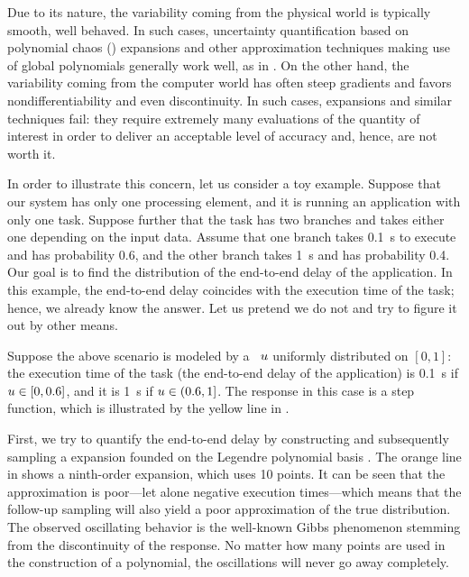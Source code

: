 
Due to its nature, the variability coming from the physical world is typically
smooth, well behaved. In such cases, uncertainty quantification based on
polynomial chaos () expansions \cite{xiu2010} and other approximation
techniques making use of global polynomials generally work well, as in
\cite{bhardwaj2008, lee2013, ukhov2014, ukhov2015}. On the other hand, the
variability coming from the computer world has often steep gradients and favors
nondifferentiability and even discontinuity. In such cases,  expansions
and similar techniques fail: they require extremely many evaluations of the
quantity of interest in order to deliver an acceptable level of accuracy and,
hence, are not worth it.

In order to illustrate this concern, let us consider a toy example. Suppose that
our system has only one processing element, and it is running an application
with only one task. Suppose further that the task has two branches and takes
either one depending on the input data. Assume that one branch takes 0.1~s to
execute and has probability 0.6, and the other branch takes 1~s and has
probability 0.4. Our goal is to find the distribution of the end-to-end delay of
the application. In this example, the end-to-end delay coincides with the
execution time of the task; hence, we already know the answer. Let us pretend we
do not and try to figure it out by other means.

Suppose the above scenario is modeled by a \rv\ $u$ uniformly distributed on
$[0, 1]$: the execution time of the task (the end-to-end delay of the
application) is 0.1~s if $u \in [0, 0.6]$, and it is 1~s if $u \in (0.6, 1]$.
The response in this case is a step function, which is illustrated by the yellow
line in .

First, we try to quantify the end-to-end delay by constructing and subsequently
sampling a  expansion founded on the Legendre polynomial basis
\cite{xiu2010}. The orange line in  shows a ninth-order 
expansion, which uses 10 points. It can be seen that the approximation is
poor---let alone negative execution times---which means that the follow-up
sampling will also yield a poor approximation of the true distribution. The
observed oscillating behavior is the well-known Gibbs phenomenon stemming from
the discontinuity of the response. No matter how many points are used in the
construction of a polynomial, the oscillations will never go away completely.

